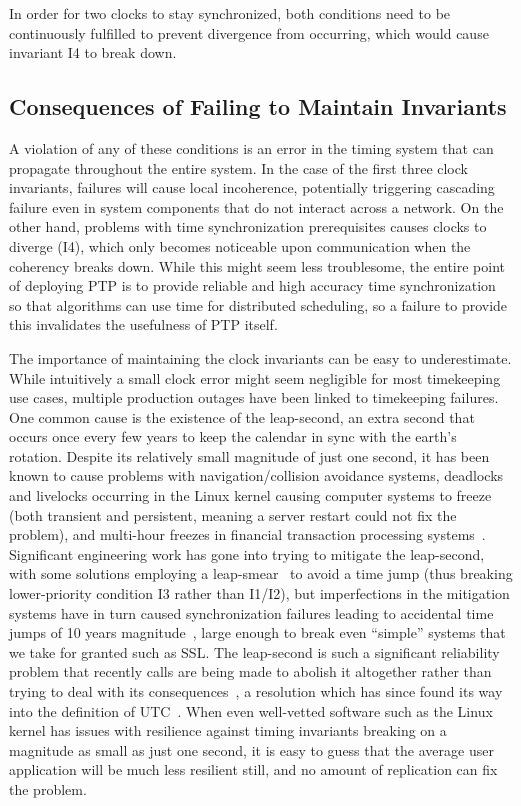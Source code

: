 In order for two clocks to stay synchronized, both conditions need to be continuously fulfilled to prevent divergence from occurring, which would cause invariant I4 to break down.

\subsection{Consequences of Failing to Maintain Invariants}
A violation of any of these conditions is an error in the timing system that can propagate throughout the entire system.
In the case of the first three clock invariants, failures will cause local incoherence, potentially triggering cascading failure even in system components that do not interact across a network. On the other hand, problems with time synchronization prerequisites causes clocks to diverge (I4), which only becomes noticeable upon communication when the coherency breaks down.
While this might seem less troublesome, the entire point of deploying PTP is to provide reliable and high accuracy time synchronization so that algorithms can use time for distributed scheduling, so a failure to provide this invalidates the usefulness of PTP itself.

The importance of maintaining the clock invariants can be easy to underestimate. While intuitively a small clock error might seem negligible for most timekeeping use cases, multiple production outages have been linked to timekeeping failures. One common cause is the existence of the leap-second, an extra second that occurs once every few years to keep the calendar in sync with the earth's rotation. Despite its relatively small magnitude of just one second, it has been known to cause problems with navigation/collision avoidance systems, deadlocks and livelocks occurring in the Linux kernel causing computer systems to freeze (both transient and persistent, meaning a server restart could not fix the problem), and multi-hour freezes in financial transaction processing systems~\cite{leap-seconds-recap}. Significant engineering work has gone into trying to mitigate the leap-second, with some solutions employing a leap-smear~\cite{leap-second-google, leap-second-technical-aspects} to avoid a time jump (thus breaking lower-priority condition I3 rather than I1/I2), but imperfections in the mitigation systems have in turn caused synchronization failures leading to accidental time jumps of 10 years magnitude~\cite{leap-seconds-recap}, large enough to break even ``simple'' systems that we take for granted such as SSL. The leap-second is such a significant reliability problem that recently calls are being made to abolish it altogether rather than trying to deal with its consequences~\cite{leap-second-facebook-abolish}, a resolution which has since found its way into the definition of UTC~\cite{leap-second-resolution}. When even well-vetted software such as the Linux kernel has issues with resilience against timing invariants breaking on a magnitude as small as just one second, it is easy to guess that the average user application will be much less resilient still, and no amount of replication can fix the problem.

